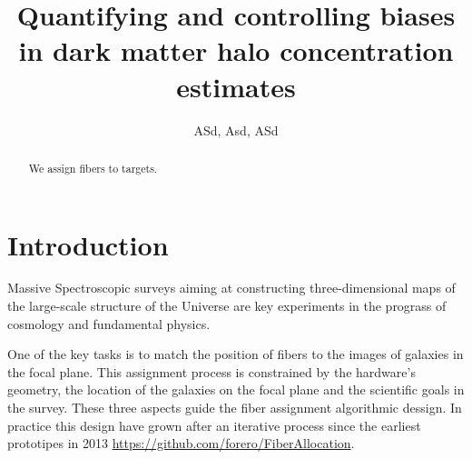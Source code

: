 \documentclass[twocolumn]{aastex62}
\begin{document}
\title{Quantifying and controlling biases in dark matter halo concentration estimates}
\author{
  ASd, Asd, ASd
}




\begin{abstract}
We assign fibers to targets.
\end{abstract}



\section{Introduction}
\label{sec:introduction}

Massive Spectroscopic surveys aiming at constructing three-dimensional
maps of the large-scale structure of the Universe are key experiments
in the prograss of cosmology and fundamental physics.

One of the key tasks is to match the position of fibers to the images
of galaxies in the focal plane. This assignment process is constrained
by the hardware's geometry, the location of the galaxies on the focal
plane and the scientific goals in the survey. 
These three aspects guide the fiber assignment algorithmic dessign.
In practice this design have grown after an iterative process since
the earliest prototipes in 2013
\url{https://github.com/forero/FiberAllocation}.   

\cite{2014SPIE.9150E..23S}
\cite{2016A&C....15....1N}


\end{document}
